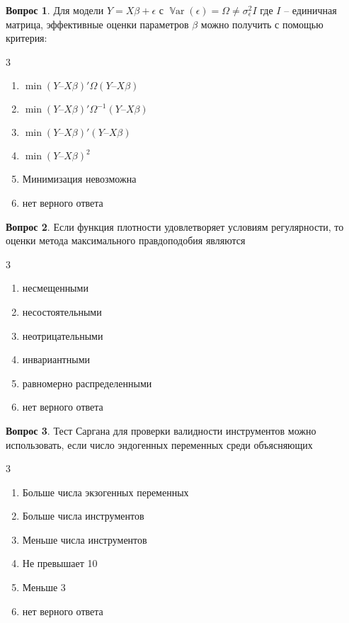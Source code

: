 \documentclass[12pt]{article}
\DeclareMathOperator{\Var}{\mathbb{V}ar}
\newenvironment{answerlist}[1][3]{
\begin{multicols}{#1}
\begin{enumerate}[label=\fbox{\emph{\Alph*}},ref=\emph{\alph*}]
}
{
\end{enumerate}
\end{multicols}
}
\theoremstyle{definition}
\newtheorem{question}{Вопрос}
\begin{document}
\begin{question}
Для модели \( Y=X\beta + \epsilon \) с \( \Var(\epsilon) = \Omega \neq \sigma_{\epsilon}^{2}I \)
где $I$ – единичная матрица,
эффективные оценки параметров $\beta$ можно получить с помощью критерия:
\begin{answerlist}
\item \( \min (Y – X \beta)' \Omega (Y – X \beta ) \) 
\item \( \min (Y – X \beta)' \Omega^{-1} (Y – X \beta ) \) 
\item \( \min (Y – X \beta)'  (Y – X \beta ) \) 
\item \( \min (Y – X \beta)^2 \) 
\item Минимизация невозможна
\item нет верного ответа
\end{answerlist}
\end{question}

\begin{question}
Если функция плотности удовлетворяет условиям регулярности, 
  то оценки метода максимального правдоподобия являются
\begin{answerlist}
\item несмещенными
\item несостоятельными
\item неотрицательными
\item инвариантными
\item равномерно распределенными
\item нет верного ответа
\end{answerlist}
\end{question}

\begin{question}
Тест Саргана для проверки валидности инструментов можно использовать, 
  если число эндогенных переменных среди объясняющих
\begin{answerlist}
\item Больше числа экзогенных переменных
\item Больше числа инструментов
\item Меньше числа инструментов
\item Не превышает 10
\item Меньше 3
\item нет верного ответа
\end{answerlist}
\end{question}
\end{document}
